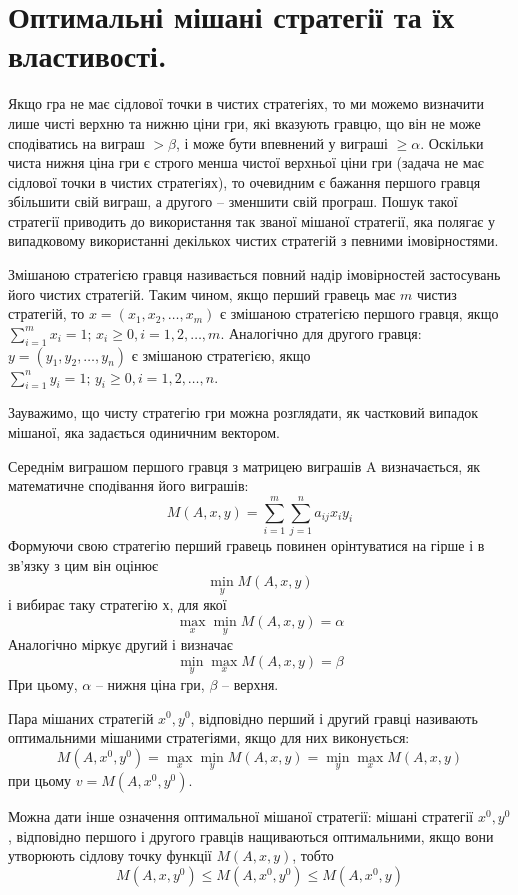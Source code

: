 \documentclass[12pt,a4paper]{report}
\begin{document}
\clearpage

\chapter{Оптимальні мішані стратегії та їх властивості.}

Якщо гра не має сідлової точки в чистих стратегіях, то ми можемо визначити лише чисті верхню та нижню ціни гри, які вказують гравцю, що він не може сподіватись на виграш $> \beta$, і може бути впевнений у виграші $\ge \alpha$. Оскільки чиста нижня ціна гри є строго менша чистої верхньої ціни гри (задача не має сідлової точки в чистих стратегіях), то очевидним є бажання першого гравця збільшити свій виграш, а другого -- зменшити свій програш. Пошук такої стратегії приводить до використання так званої мішаної стратегії, яка полягає у випадковому використанні декількох чистих стратегій з певними імовірностями.

Змішаною стратегією гравця називається повний надір імовірностей застосувань його чистих стратегій. Таким чином, якщо перший гравець має $m$ чистиз стратегій, то $x=(x_1, x_2, \dots, x_m)$ є змішаною стратегією першого гравця, якщо $\sum_{i=1}^m x_i = 1; \, x_i \ge 0, i=1, 2, \dots, m$. Аналогічно для другого гравця: $y=(y_1, y_2, \dots, y_n)$ є змішаною стратегією, якщо$\sum_{i=1}^n y_i = 1; \, y_i \ge 0, i=1, 2, \dots, n$.

Зауважимо, що чисту стратегію гри можна розглядати, як частковий випадок мішаної, яка задається одиничним вектором.

Середнім виграшом першого гравця з матрицею виграшів A визначається, як математичне сподівання його виграшів:
\[
M(A, x, y)=\sum_{i=1}^m\sum_{j=1}^n a_{ij}x_i y_i
\]
Формуючи свою стратегію перший гравець повинен орінтуватися на гірше $і$ в зв'язку з цим він оцінює
\[\min_y M(A, x, y)\]
і вибирає таку стратегію $х$, для якої
\[\max_x\min_y M(A, x, y)=\alpha\]
Аналогічно міркує другий і визначає
\[\min_y\max_x M(A, x, y)=\beta\]
При цьому, $\alpha$ -- нижня ціна гри, $\beta$ -- верхня.

Пара мішаних стратегій $x^0, y^0$, відповідно перший і другий гравці називають оптимальними мішаними стратегіями, якщо для них виконується:
\[M(A, x^0, y^0)=\max_x\min_y M(A, x, y)=\min_y\max_x M(A, x, y)\]
при цьому $v = M(A, x^0, y^0)$.

Можна дати інше означення оптимальної мішаної стратегії: мішані стратегії $x^0, y^0$, відповідно першого і другого гравців нащиваються оптимальними, якщо вони утворюють сідлову точку функції $M(A, x, y)$, тобто
\[ M(A, x, y^0) \le M(A, x^0, y^0) \le M(A, x^0, y)\]
\end{document}
